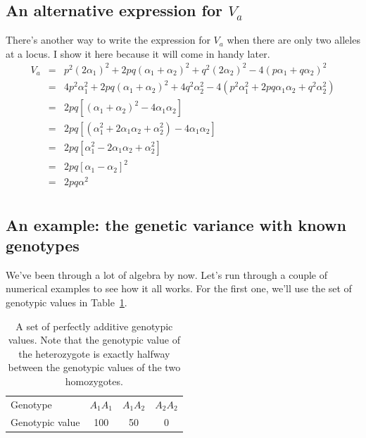 \documentclass[12pt]{article}
\begin{document}
\subsection*{An alternative expression for $V_a$}

There's another way to write the expression for $V_a$ when there are
only two alleles at a locus. I show it here because it will come in
handy later.
\begin{eqnarray*}
V_a &=& p^2(2\alpha_1)^2 + 2pq(\alpha_1+\alpha_2)^2 + q^2(2\alpha_2)^2 -
        4(p\alpha_1+q\alpha_2)^2 \\
    &=& 4p^2\alpha_1^2 + 2pq(\alpha_1+\alpha_2)^2 + 4q^2\alpha_2^2
       - 4(p^2\alpha_1^2 +2pq\alpha_1\alpha_2 + q^2\alpha_2^2) \\
    &=& 2pq[(\alpha_1+\alpha_2)^2 - 4\alpha_1\alpha_2] \\
    &=& 2pq[(\alpha_1^2 + 2\alpha_1\alpha_2 + \alpha_2^2) - 4\alpha_1\alpha_2] \\
    &=& 2pq[\alpha_1^2 - 2\alpha_1\alpha_2 + \alpha_2^2] \\
    &=& 2pq[\alpha_1 - \alpha_2]^2 \\
    &=& 2pq\alpha^2 \\
\end{eqnarray*}

\subsection*{An example: the genetic variance with known genotypes}

We've been through a lot of algebra by now. Let's run through a couple
of numerical examples to see how it all works. For the first one,
we'll use the set of genotypic values in Table~\ref{table:additive}.

\begin{table}
\begin{center}
\begin{tabular}{l|ccc}
\hline\hline
Genotype        & $A_1A_1$ & $A_1A_2$ & $A_2A_2$ \\
Genotypic value &  100       & 50        & 0 \\
\hline
\end{tabular}
\end{center}
\caption{A set of perfectly additive genotypic values. Note that the
  genotypic value of the heterozygote is exactly halfway between the
  genotypic values of the two homozygotes.}\label{table:additive}
\end{table}
\end{document}
